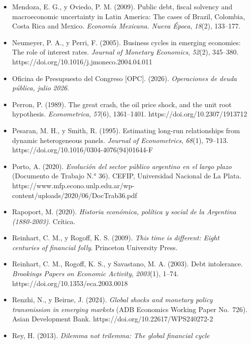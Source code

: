 \begin{itemize}[label={},leftmargin=1.27cm,itemindent=-1.27cm,itemsep=0.6\baselineskip]
{  and a panel fiscal reaction function: Results for a selected number of
  countries} (European Economy Economic Papers No.~459). Comisión
  Europea. https://doi.org/10.2765/26084
\item
  Mendoza, E. G., y Oviedo, P. M. (2009). Public debt, fiscal solvency
  and macroeconomic uncertainty in Latin America: The cases of Brazil,
  Colombia, Costa Rica and Mexico. \emph{Economía Mexicana. Nueva
  Época}, \emph{18}(2), 133--177.
\item
  Neumeyer, P. A., y Perri, F. (2005). Business cycles in emerging
  economies: The role of interest rates. \emph{Journal of Monetary
  Economics}, \emph{52}(2), 345--380.
  https://doi.org/10.1016/j.jmoneco.2004.04.011
\item
  Oficina de Presupuesto del Congreso {[}OPC{]}. (2026).
  \emph{Operaciones de deuda pública, julio 2026}.
\item
  Perron, P. (1989). The great crash, the oil price shock, and the unit
  root hypothesis. \emph{Econometrica}, \emph{57}(6), 1361--1401.
  https://doi.org/10.2307/1913712
\item
  Pesaran, M. H., y Smith, R. (1995). Estimating long-run relationships
  from dynamic heterogeneous panels. \emph{Journal of Econometrics},
  \emph{68}(1), 79--113. https://doi.org/10.1016/0304-4076(94)01644-F
\item
  Porto, A. (2020). \emph{Evolución del sector público argentino en el
  largo plazo} (Documento de Trabajo N.° 36). CEFIP, Universidad
  Nacional de La Plata.
  https://www.mfp.econo.unlp.edu.ar/wp-content/uploads/2020/06/DocTrab36.pdf
\item
  Rapoport, M. (2020). \emph{Historia económica, política y social de la
  Argentina (1880-2003)}. Crítica.
\item
  Reinhart, C. M., y Rogoff, K. S. (2009). \emph{This time is different:
  Eight centuries of financial folly}. Princeton University Press.
\item
  Reinhart, C. M., Rogoff, K. S., y Savastano, M. A. (2003). Debt
  intolerance. \emph{Brookings Papers on Economic Activity},
  \emph{2003}(1), 1--74. https://doi.org/10.1353/eca.2003.0018
\item
  Renzhi, N., y Beirne, J. (2024). \emph{Global shocks and monetary
  policy transmission in emerging markets} (ADB Economics Working Paper
  No.~726). Asian Development Bank. https://doi.org/10.22617/WPS240272-2
\item
  Rey, H. (2013). \emph{Dilemma not trilemma: The global financial cycle
}
\end{itemize}
